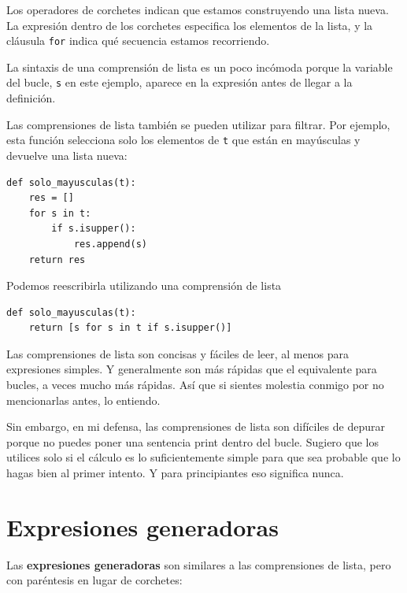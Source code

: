\documentclass[10pt]{book}
\begin{document}
Los operadores de corchetes indican que estamos construyendo una lista
nueva.  La expresión dentro de los corchetes especifica los elementos
de la lista, y la cláusula {\tt for} indica qué secuencia
estamos recorriendo.

La sintaxis de una comprensión de lista es un poco incómoda porque
la variable del bucle, {\tt s} en este ejemplo, aparece en la expresión
antes de llegar a la definición.

Las comprensiones de lista también se pueden utilizar para filtrar.  Por ejemplo,
esta función selecciona solo los elementos de {\tt t} que están
en mayúsculas y devuelve una lista nueva:


\begin{verbatim}
def solo_mayusculas(t):
    res = []
    for s in t:
        if s.isupper():
            res.append(s)
    return res
\end{verbatim}

Podemos reescribirla utilizando una comprensión de lista

\begin{verbatim}
def solo_mayusculas(t):
    return [s for s in t if s.isupper()]
\end{verbatim}

Las comprensiones de lista son concisas y fáciles de leer, al menos para expresiones
simples.  Y generalmente son más rápidas que el equivalente para
bucles, a veces mucho más rápidas.  Así que si sientes molestia conmigo por no
mencionarlas antes, lo entiendo.

Sin embargo, en mi defensa, las comprensiones de lista son difíciles de depurar porque
no puedes poner una sentencia print dentro del bucle.  Sugiero que los
utilices solo si el cálculo es lo suficientemente simple para que sea probable
que lo hagas bien al primer intento.  Y para principiantes eso significa nunca.



\section{Expresiones generadoras}

Las {\bf expresiones generadoras} son similares a las comprensiones de lista, pero
con paréntesis en lugar de corchetes:
\end{document}
